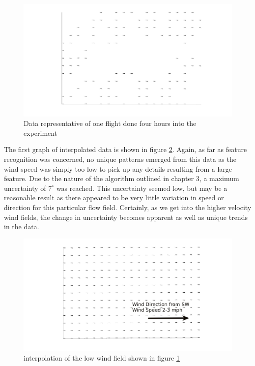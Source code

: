 \documentclass[12pt]{report}
\begin{document}
\begin{figure}[!ht]
	\centering
	\includegraphics[scale=0.2]{low_wind_raw.jpg}
	\caption{Data representative of one flight done four hours into the experiment}
	\label{fig:low_wind_raw}
\end{figure}
The first graph of interpolated data is shown in figure \ref{fig:low_wind_interp}. Again, as far as feature recognition was concerned, no unique patterns emerged from this data as the wind speed was simply too low to pick up any details resulting from a large feature. Due to the nature of the algorithm outlined in chapter 3, a maximum uncertainty of $7^\circ$ was reached. This uncertainty seemed low, but may be a reasonable result as there appeared to be very little variation in speed or direction for this particular flow field. Certainly, as we get into the higher velocity wind fields, the change in uncertainty becomes apparent as well as unique trends in the data.

\begin{figure}[!ht]
	\centering
	\includegraphics[scale=.2]{low_wind_interp2.jpg}
	\caption{interpolation of the low wind field shown in figure \ref{fig:low_wind_raw}} 
	\label{fig:low_wind_interp}
\end{figure}
\end{document}
